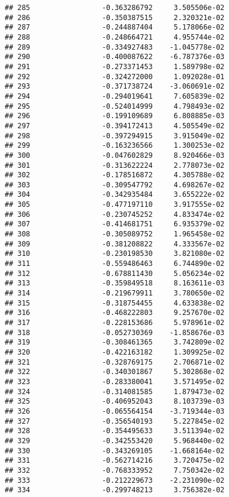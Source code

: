 \documentclass[
]{article}
\begin{document}
\begin{verbatim}
## 285                 -0.363286792     3.505506e-02
## 286                 -0.350387515     2.320321e-02
## 287                 -0.244887404     5.178066e-02
## 288                 -0.248664721     4.955744e-02
## 289                 -0.334927483    -1.045778e-02
## 290                 -0.400087622    -6.787376e-03
## 291                 -0.273371453     1.589798e-02
## 292                 -0.324272000     1.092028e-01
## 293                 -0.371738724    -3.060691e-02
## 294                 -0.294019641     7.605839e-02
## 295                 -0.524014999     4.798493e-02
## 296                 -0.199109689     6.808885e-03
## 297                 -0.394172413     4.505549e-02
## 298                 -0.397294915     3.915049e-02
## 299                 -0.163236566     1.300253e-02
## 300                 -0.047602829     8.920466e-03
## 301                 -0.313622224     2.778073e-02
## 302                 -0.178516872     4.305788e-02
## 303                 -0.309547792     4.698267e-02
## 304                 -0.342935484     3.655222e-02
## 305                 -0.477197110     3.917555e-02
## 306                 -0.230745252     4.833474e-02
## 307                 -0.414681751     6.935379e-02
## 308                 -0.305089752     1.965458e-02
## 309                 -0.381208822     4.333567e-02
## 310                 -0.230198530     3.821080e-02
## 311                 -0.559486463     6.744890e-02
## 312                 -0.678811430     5.056234e-02
## 313                 -0.359849518     8.163611e-03
## 314                 -0.219679911     3.780650e-02
## 315                 -0.318754455     4.633838e-02
## 316                 -0.468222803     9.257670e-02
## 317                 -0.228153686     5.978961e-02
## 318                 -0.052730369    -1.858676e-03
## 319                 -0.308461365     3.742809e-02
## 320                 -0.422163182     1.309925e-02
## 321                 -0.328769175     2.706871e-02
## 322                 -0.340301867     5.302868e-02
## 323                 -0.283380041     3.571495e-02
## 324                 -0.314081585     1.879473e-02
## 325                 -0.406952043     8.103739e-03
## 326                 -0.065564154    -3.719344e-03
## 327                 -0.356540193     5.227845e-02
## 328                 -0.354495633     3.511394e-02
## 329                 -0.342553420     5.968440e-02
## 330                 -0.343269105    -1.668164e-02
## 331                 -0.562714216     3.720475e-02
## 332                 -0.768333952     7.750342e-02
## 333                 -0.212229673    -2.231090e-02
## 334                 -0.299748213     3.756382e-02

\end{verbatim}
\end{document}
